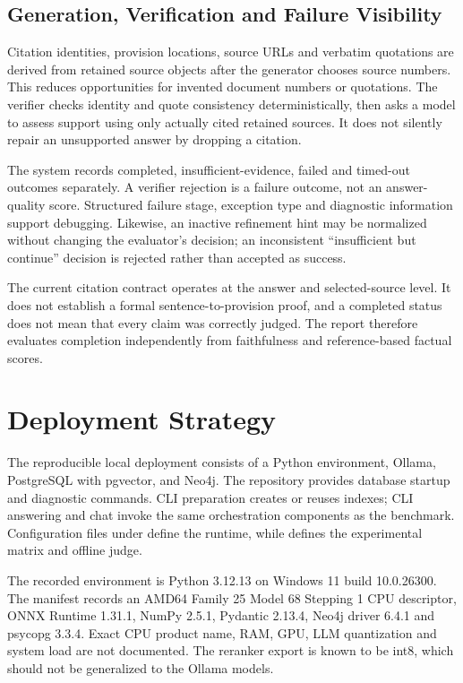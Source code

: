 \subsection{Generation, Verification and Failure Visibility}
Citation identities, provision locations, source URLs and verbatim quotations are derived from retained source objects after the generator chooses source numbers. This reduces opportunities for invented document numbers or quotations. The verifier checks identity and quote consistency deterministically, then asks a model to assess support using only actually cited retained sources. It does not silently repair an unsupported answer by dropping a citation.

The system records completed, insufficient-evidence, failed and timed-out outcomes separately. A verifier rejection is a failure outcome, not an answer-quality score. Structured failure stage, exception type and diagnostic information support debugging. Likewise, an inactive refinement hint may be normalized without changing the evaluator's decision; an inconsistent ``insufficient but continue'' decision is rejected rather than accepted as success.

The current citation contract operates at the answer and selected-source level. It does not establish a formal sentence-to-provision proof, and a completed status does not mean that every claim was correctly judged. The report therefore evaluates completion independently from faithfulness and reference-based factual scores.

\section{Deployment Strategy}
The reproducible local deployment consists of a Python environment, Ollama, PostgreSQL with pgvector, and Neo4j. The repository provides database startup and diagnostic commands. CLI preparation creates or reuses indexes; CLI answering and chat invoke the same orchestration components as the benchmark. Configuration files under  define the runtime, while  defines the experimental matrix and offline judge.

The recorded environment is Python 3.12.13 on Windows 11 build 10.0.26300. The manifest records an AMD64 Family 25 Model 68 Stepping 1 CPU descriptor, ONNX Runtime 1.31.1, NumPy 2.5.1, Pydantic 2.13.4, Neo4j driver 6.4.1 and psycopg 3.3.4. Exact CPU product name, RAM, GPU, LLM quantization and system load are not documented. The reranker export is known to be int8, which should not be generalized to the Ollama models.


